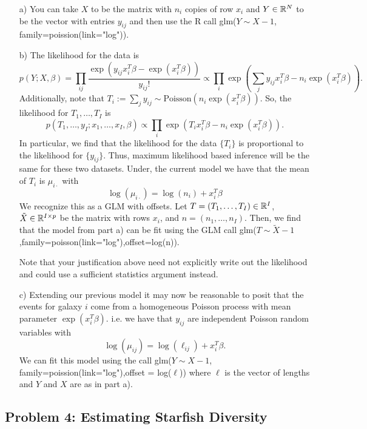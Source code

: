 \begin{enumerate}
\item[a)]
You can take $X$ to be the matrix with $n_i$ copies of row $x_i$ and $Y \in \mathbb{R}^{N}$ to be the vector with entries $y_{ij}$ and then use the R call glm($Y \sim X-1$, family=poission(link="log")).
\item[b)]
The likelihood for the data is 
\[
p(Y;X,\beta) = \prod_{ij} \frac{ \exp( y_{ij} x_i^T\beta - \exp(x_i^T\beta )) }{y_{ij}!} \propto \prod_i \exp(\sum_{j} y_{ij} x_i^T\beta - n_i\exp(x_i^T\beta)). 
\]
Additionally, note that $T_{i} := \sum_{j} y_{ij} \sim \text{Poisson}(n_i\exp(x_i^T\beta))$. So, the likelihood for $T_{1},\dots,T_{I}$ is 
\[
p(T_{1},\dots,y_{I};x_1,\dots,x_I,\beta) \propto \prod_i \exp(T_{i} x_i^T\beta - n_i\exp(x_i^T\beta)).
\]
In particular, we find that the likelihood for the data  $\{T_{i}\}$ is proportional to the likelihood for $\{y_{ij}\}$. Thus, maximum likelihood based inference will be the same for these two datasets.  Under, the current model we have that the mean of $T_{i}$ is $\mu_{i\cdot}$ with 
\[
\log(\mu_{i\cdot}) = \log(n_i) + x_i^T\beta
\] 
We recognize this as a GLM with offsets. Let $T =(T_1,\dots,T_I) \in \mathbb{R}^I$, $\tilde{X} \in \mathbb{R}^{I \times p}$ be the matrix with rows $x_i$, and $n = (n_1,\dots,n_I)$. Then, we find that the model from part a) can be fit using the GLM call glm($T \sim \tilde{X} - 1$,family=poisson(link="log"),offset=log(n)).

Note that your justification above need not explicitly write out the likelihood and could use a sufficient statistics argument instead. %
\item[c)]
Extending our previous model it may now be reasonable to posit that the events for galaxy $i$ come from a homogeneous Poisson process with mean parameter $\exp(x_i^T\beta)$. i.e. we have that $y_{ij}$ are independent Poisson random variables with  
\[
\log(\mu_{ij}) = \log(\ell_{ij}) + x_i^T\beta. 
\]
We can fit this model using the call glm($Y \sim X-1$, family=poission(link="log"),offset = log($\ell$)) where $\ell$ is the vector of lengths and $Y$ and $X$ are as in part a).
\end{enumerate}

\subsection*{Problem 4: Estimating Starfish Diversity}

